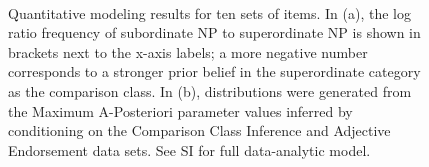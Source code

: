 \documentclass[doc, floatsintext]{apa6}
\begin{document}
\begin{figure}[t!]
    \centering
       \\
    \caption{Quantitative modeling results for ten sets of items. In (a), the log ratio frequency of subordinate NP to superordinate NP is shown in brackets next to the x-axis labels; a more negative number corresponds to a stronger prior belief in the superordinate category as the comparison class. In (b), distributions were generated from the Maximum A-Posteriori parameter values inferred by conditioning on the Comparison Class Inference and Adjective Endorsement data sets. See SI for full data-analytic model.}
    \label{fig:by_item_results}
\end{figure}




\end{document}
